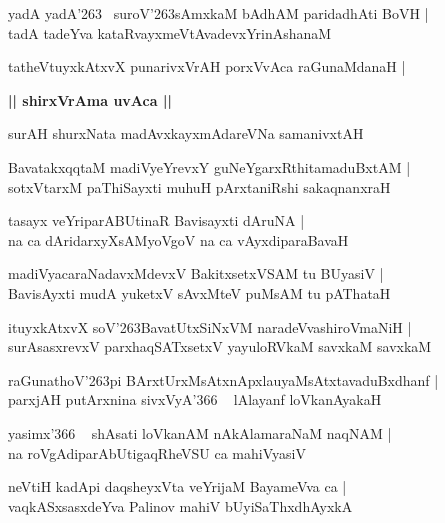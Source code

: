 \documentclass[twoside,12pt,openright]{book}
\def\S{\char'263}
\newcounter{shloka}[chapter]
\def\uvaca#1{\centerline{{\large\textbf{#1}}}}
\begin{document}
\begin{shloka}%
yadA yadA\S ~ suroV\S sAmxkaM bAdhAM paridadhAti BoVH |\\
tadA tadeYva kataRvayxmeVtAvadevxYrinAshanaM 
\end{shloka}

\begin{shloka}%
tatheVtuyxkAtxvX punarivxVrAH porxVvAca raGunaMdanaH |\\
\uvaca{|| shirxVrAma uvAca ||}
surAH shurxNata madAvxkayxmAdareVNa samanivxtAH
\end{shloka}

\begin{shloka}%
BavatakxqqtaM madiVyeYrevxY guNeYgarxRthitamaduBxtAM |\\
sotxVtarxM paThiSayxti muhuH pArxtaniRshi sakaqnanxraH 
\end{shloka}

\begin{shloka}%
tasayx veYriparABUtinaR Bavisayxti dAruNA |\\
na ca dAridarxyXsAMyoVgoV na ca vAyxdiparaBavaH 
\end{shloka}

\begin{shloka}%
madiVyacaraNadavxMdevxV BakitxsetxVSAM tu BUyasiV |\\
BavisAyxti mudA yuketxV sAvxMteV puMsAM tu pAThataH 
\end{shloka}

\begin{shloka}%
ituyxkAtxvX soV\S BavatUtxSiNxVM naradeVvashiroVmaNiH |\\
surAsasxrevxV parxhaqSATxsetxV yayuloRVkaM savxkaM savxkaM 
\end{shloka}

\begin{shloka}%
raGunathoV\S pi BArxtUrxMsAtxnApxlauyaMsAtxtavaduBxdhanf |\\
parxjAH putArxnina sivxVyA\char'366 ~ lAlayanf loVkanAyakaH
\end{shloka}

\begin{shloka}%
yasimx\char'366 ~ shAsati loVkanAM nAkAlamaraNaM naqNAM |\\
na roVgAdiparAbUtigaqRheVSU ca mahiVyasiV
\end{shloka}

\begin{shloka}%
neVtiH kadApi daqsheyxVta veYrijaM BayameVva ca |\\
vaqkASxsasxdeYva Palinov mahiV bUyiSaThxdhAyxkA
\end{shloka}
\end{document}
